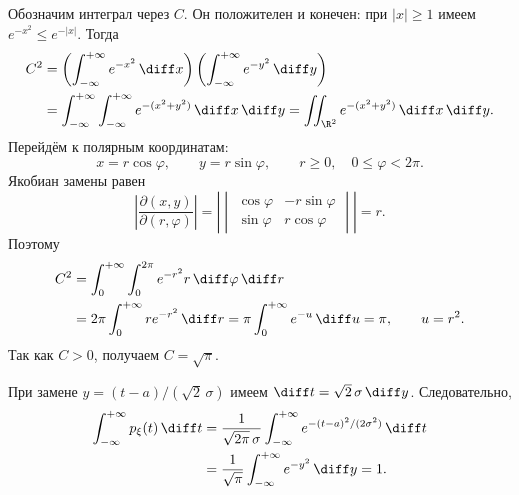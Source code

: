 \begin{Proof}
    Обозначим интеграл через $C$. Он положителен и конечен:
    при $|x|\geq1$ имеем $e^{-x^2}\leq e^{-|x|}$.
    Тогда
    \[
        \begin{aligned}
            C^2
            &=\left(\int_{-\infty}^{+\infty}e^{-x^2}\,\diff x\right)
              \left(\int_{-\infty}^{+\infty}e^{-y^2}\,\diff y\right)\\
            &=\int_{-\infty}^{+\infty}\int_{-\infty}^{+\infty}
              e^{-(x^2+y^2)}\,\diff x\,\diff y
              =\iint_{\R^2}e^{-(x^2+y^2)}\,\diff x\,\diff y.
        \end{aligned}
    \]
    Перейдём к полярным координатам:
    \[
        x=r\cos\varphi,\qquad y=r\sin\varphi,
        \qquad r\geq0,\quad0\leq\varphi<2\pi.
    \]
    Якобиан замены равен
    \[
        \left|\frac{\partial(x,y)}{\partial(r,\varphi)}\right|
        =\left|\begin{vmatrix}
            \cos\varphi&-r\sin\varphi\\
            \sin\varphi&r\cos\varphi
        \end{vmatrix}\right|=r.
    \]
    Поэтому
    \[
        \begin{aligned}
            C^2&=\int_0^{+\infty}\int_0^{2\pi}
                  e^{-r^2}r\,\diff\varphi\,\diff r\\
               &=2\pi\int_0^{+\infty}r e^{-r^2}\,\diff r
                 =\pi\int_0^{+\infty}e^{-u}\,\diff u=\pi,
                 \qquad u=r^2.
        \end{aligned}
    \]
    Так как $C>0$, получаем $C=\sqrt\pi$.
\end{Proof}

\begin{Proof}
    При замене $y=(t-a)/(\sqrt2\,\sigma)$ имеем
    $\diff t=\sqrt2\,\sigma\,\diff y$. Следовательно,
    \[
        \begin{aligned}
            \int_{-\infty}^{+\infty}p_\xi(t)\,\diff t
            &=\frac{1}{\sqrt{2\pi}\,\sigma}
              \int_{-\infty}^{+\infty}
              e^{-(t-a)^2/(2\sigma^2)}\,\diff t\\
            &=\frac1{\sqrt\pi}\int_{-\infty}^{+\infty}
              e^{-y^2}\,\diff y=1.
        \end{aligned}
    \]
\end{Proof}
\endgroup
